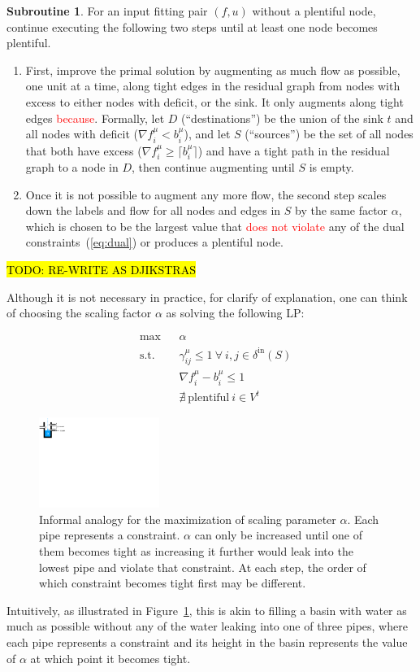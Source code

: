 \documentclass[11pt]{article}
\theoremstyle{definition}
\theoremstyle{definition}
\newtheorem{subroutine}{Subroutine}
\newcommand{\fu}{f^{\mu}}
\newcommand{\nfiu}{\nabla \fu_i}
\newcommand{\biu}{b_{i}^{\mu}}
\newcommand{\din}{\delta^{\text{in}}}
\newcommand{\vsink}{V^{t}}
\newcommand{\rewrite}[1]{\textcolor{red}{#1}}
\newcommand{\todo}[1]{\hl{TODO: #1}}
\newcommand{\lpeq}[1] {
\begin{equation*}
\begin{aligned}
#1
\end{aligned}
\end{equation*}
}
\newcommand{\lpone}[3] {
& \underset{}{\text{#1}}
&& #2 \\
& \text{s.t.}
&& #3 
}
\newcommand{\lptwo}[4] {
\lpone{#1}{#2}{#3}\\
&&& #4
}
\newcommand{\lpthree}[5] {
\lptwo{#1}{#2}{#3}{#4}\\
&&& #5
}
\begin{document}
		\begin{subroutine}
		For an input fitting pair $(f,u)$ without a plentiful node,
		continue executing the following two steps until at least one node becomes
		plentiful.
		\begin{enumerate}
		\item First, improve the primal solution by augmenting as much flow as possible,
		one unit at a time, along tight edges in the residual graph 
		from nodes with excess to either nodes with deficit, or the sink.
		It only augments along tight edges \rewrite{because}. Formally, let
		$D$ (``destinations'') be the union of the sink $t$ and all nodes with 
		deficit ($\nabla f_i^{\mu} < b_i^{\mu}$), and let $S$ (``sources'') be
		the set of all nodes that both have excess ($\nabla f_i^{\mu} \ge \lceil b_i^{\mu} \rceil$)
		and have a tight path in the residual graph to a node in $D$, then
		continue augmenting until $S$ is empty.
		\item Once it is not possible to augment any more flow, the second step scales down
		the labels and flow for all nodes and edges in $S$ by the same factor $\alpha$,
		which is chosen to be the largest value that \rewrite{does not violate} any of the dual
		constraints~(\ref{eq:dual}) or produces a plentiful node.
		\end{enumerate}
		\end{subroutine}

		\todo{RE-WRITE AS DJIKSTRAS}
		
		Although it is not necessary in practice, for clarify of explanation, one can think of choosing the scaling factor $\alpha$ as solving
		the following LP:
		\lpeq{\lpthree{max}
		{\alpha}
		{\gamma_{ij}^{\mu} \le 1\ \forall\ i,j \in \din(S)}
		{\nfiu - \biu \le 1}
		{\nexists\ \text{plentiful}\ i \in \vsink}
		}
		\begin{figure}[b!]
		\centering
		\includegraphics[width=0.35\textwidth]{figs/water.pdf}
		\caption{
		\label{fig:alpha}
		Informal analogy for the maximization of scaling parameter $\alpha$.
		Each pipe represents a constraint. $\alpha$ can only be increased until
		one of them becomes tight as increasing it further would leak into
		the lowest pipe and violate that constraint.
		At each step, the order of which constraint becomes tight first may be different.
		}
		\end{figure}
		Intuitively, as illustrated in Figure~\ref{fig:alpha}, this is akin to filling
		a basin with water as much as possible without any of the water leaking into one
		of three pipes, where each pipe represents a constraint and its height in the basin
		represents the value of $\alpha$ at which point it becomes tight.
		
\end{document}
